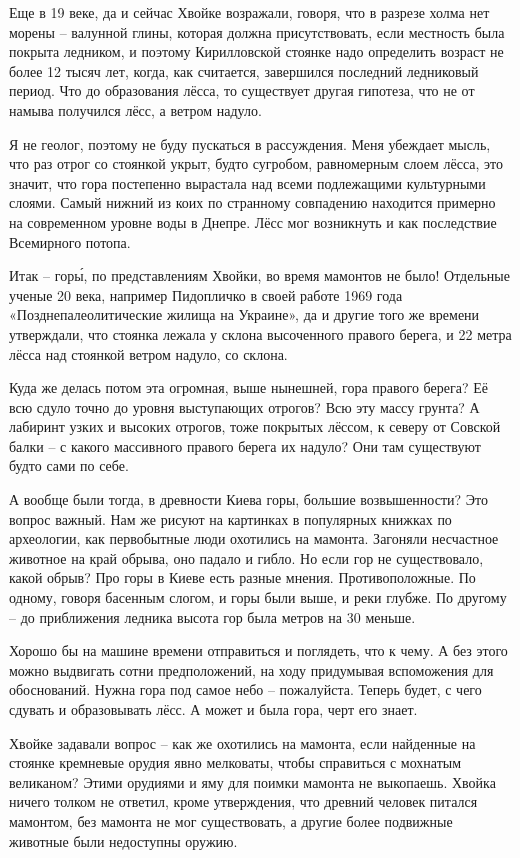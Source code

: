 Еще в 19 веке, да и сейчас Хвойке возражали, говоря, что в разрезе холма нет морены – валунной глины, которая должна присутствовать, если местность была покрыта ледником, и поэтому Кирилловской стоянке надо определить возраст не более 12 тысяч лет, когда, как считается, завершился последний ледниковый период. Что до образования лёсса, то существует другая гипотеза, что не от намыва получился лёсс, а ветром надуло.

Я не геолог, поэтому не буду пускаться в рассуждения. Меня убеждает мысль, что раз отрог со стоянкой укрыт, будто сугробом, равномерным слоем лёсса, это значит, что гора постепенно вырастала над всеми подлежащими культурными слоями. Самый нижний из коих по странному совпадению находится примерно на современном уровне воды в Днепре. Лёсс мог возникнуть и как последствие Всемирного потопа.

Итак – гор\'ы, по представлениям Хвойки, во время мамонтов не было! Отдельные ученые 20 века, например Пидопличко в своей работе 1969 года «Позднепалеолитические жилища на Украине», да и другие того же времени утверждали, что стоянка лежала у склона высоченного правого берега, и 22 метра лёсса над стоянкой ветром надуло, со склона.

Куда же делась потом эта огромная, выше нынешней, гора правого берега? Её всю сдуло точно до уровня выступающих отрогов? Всю эту массу грунта? А лабиринт узких и высоких отрогов, тоже покрытых лёссом, к северу от Совской балки – с какого массивного правого берега их надуло? Они там существуют будто сами по себе.

А вообще были тогда, в древности Киева горы, большие возвышенности? Это вопрос важный. Нам же рисуют на картинках в популярных книжках по археологии, как первобытные люди охотились на мамонта. Загоняли несчастное животное на край обрыва, оно падало и гибло. Но если гор не существовало, какой обрыв? Про горы в Киеве есть разные мнения. Противоположные. По одному, говоря басенным слогом, и горы были выше, и реки глубже. По другому – до приближения ледника высота гор была метров на 30 меньше.

Хорошо бы на машине времени отправиться и поглядеть, что к чему. А без этого можно выдвигать сотни предположений, на ходу придумывая вспоможения для обоснований. Нужна гора под самое небо – пожалуйста. Теперь будет, с чего сдувать и образовывать лёсс. А может и была гора, черт его знает.

Хвойке задавали вопрос – как же охотились на мамонта, если найденные на стоянке кремневые орудия явно мелковаты, чтобы справиться с мохнатым великаном? Этими орудиями и яму для поимки мамонта не выкопаешь. Хвойка ничего толком не ответил, кроме утверждения, что древний человек питался мамонтом, без мамонта не мог существовать, а другие более подвижные животные были недоступны оружию.

